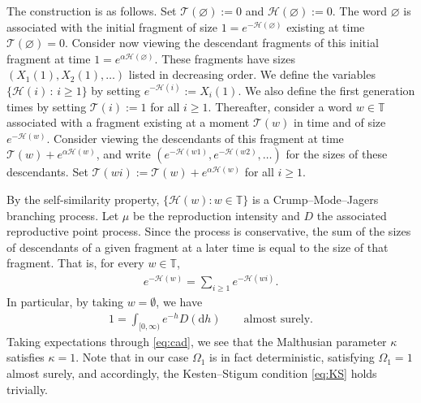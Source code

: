 \documentclass[a4,12pt]{amsart}
\numberwithin{equation}{section}
\begin{document}
	The construction is as follows. Set $\mathcal{T}(\varnothing) := 0$ and $\mathcal{H}(\varnothing) := 0$. 
	The word $\varnothing$ is associated with the initial fragment of size $1 = e^{- \mathcal{H}(\varnothing)}$ 
	existing at time $\mathcal{T}(\varnothing) = 0$. Consider now viewing the descendant fragments of this 
	initial fragment at time 
	$1 = e^{\alpha \mathcal{H}(\varnothing)}$. These fragments have 
	sizes $(X_1(1),X_2(1),\ldots)$ listed in decreasing order. We define the  variables 
	$\{ \mathcal{H}(i) \,:\, i \geq 1 \}$ by setting $e^{ - \mathcal{H}(i)} := X_{i}(1)$. We also define the 
	first generation times by setting $\mathcal{T}(i) := 1$ for all $i \geq 1$. Thereafter, consider a 
	word $w \in \mathbb{T}$ associated with a fragment existing at a moment $\mathcal{T}(w)$ in time 
	and of size $e^{- \mathcal{H}(w) }$. Consider viewing the descendants of this fragment at time 
	$\mathcal{T}(w) + e^{ \alpha \mathcal{H}(w) }$, and write $(e^{ - \mathcal{H}(w1)},e^{-\mathcal{H}(w2)},\ldots)$ 
	for the sizes of these descendants. Set $\mathcal{T}(wi) :=\mathcal{T}(w) + e^{ \alpha \mathcal{H}(w) }$ 
	for all $i \geq 1$. 

	By the self-similarity property, $\{ \mathcal{H}(w) : w \in \mathbb{T} \}$ is a Crump–Mode–Jagers branching process. 
	Let $\mu$ be the reproduction intensity and $D$ the associated reproductive point process.
    Since the process is conservative, the sum of the sizes of descendants of a given fragment at a later time 
	is equal to the size of that fragment. That is, for every $w \in \mathbb{T}$,
	\begin{align*} 
		e^{- \mathcal{H}(w)} = \sum_{i \geq 1} e^{- \mathcal{H}(wi)}.
	\end{align*}
	In particular, by taking $w=\emptyset$, we have 
	\begin{align} \label{eq:cad}
		1 = \int_{ [0,\infty) } e^{-h} D(\mathrm{d}h) \qquad \text{almost surely}.
	\end{align}   
    Taking expectations through \eqref{eq:cad}, we see that the Malthusian parameter $\kappa$ satisfies $\kappa = 1$. Note that in our case $\Omega_1$ is in fact deterministic, satisfying $\Omega_1 = 1$ almost surely, and accordingly, the Kesten--Stigum condition \eqref{eq:KS} holds trivially.                         
\vspace{3mm}
\end{document}
